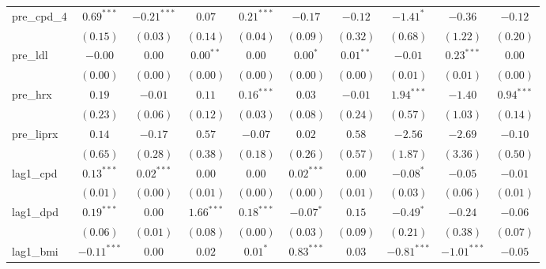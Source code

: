 \begin{tabular}{l c c c c c c c c c}
pre\_cpd\_4      & $0.69^{***}$  & $-0.21^{***}$ & $0.07$        & $0.21^{***}$  & $-0.17$       & $-0.12$        & $-1.41^{*}$   & $-0.36$       & $-0.12$        \\
                 & $(0.15)$      & $(0.03)$      & $(0.14)$      & $(0.04)$      & $(0.09)$      & $(0.32)$       & $(0.68)$      & $(1.22)$      & $(0.20)$       \\
pre\_ldl         & $-0.00$       & $0.00$        & $0.00^{**}$   & $0.00$        & $0.00^{*}$    & $0.01^{**}$    & $-0.01$       & $0.23^{***}$  & $0.00$         \\
                 & $(0.00)$      & $(0.00)$      & $(0.00)$      & $(0.00)$      & $(0.00)$      & $(0.00)$       & $(0.01)$      & $(0.01)$      & $(0.00)$       \\
pre\_hrx         & $0.19$        & $-0.01$       & $0.11$        & $0.16^{***}$  & $0.03$        & $-0.01$        & $1.94^{***}$  & $-1.40$       & $0.94^{***}$   \\
                 & $(0.23)$      & $(0.06)$      & $(0.12)$      & $(0.03)$      & $(0.08)$      & $(0.24)$       & $(0.57)$      & $(1.03)$      & $(0.14)$       \\
pre\_liprx       & $0.14$        & $-0.17$       & $0.57$        & $-0.07$       & $0.02$        & $0.58$         & $-2.56$       & $-2.69$       & $-0.10$        \\
                 & $(0.65)$      & $(0.28)$      & $(0.38)$      & $(0.18)$      & $(0.26)$      & $(0.57)$       & $(1.87)$      & $(3.36)$      & $(0.50)$       \\
lag1\_cpd        & $0.13^{***}$  & $0.02^{***}$  & $0.00$        & $0.00$        & $0.02^{***}$  & $0.00$         & $-0.08^{*}$   & $-0.05$       & $-0.01$        \\
                 & $(0.01)$      & $(0.00)$      & $(0.01)$      & $(0.00)$      & $(0.00)$      & $(0.01)$       & $(0.03)$      & $(0.06)$      & $(0.01)$       \\
lag1\_dpd        & $0.19^{***}$  & $0.00$        & $1.66^{***}$  & $0.18^{***}$  & $-0.07^{*}$   & $0.15$         & $-0.49^{*}$   & $-0.24$       & $-0.06$        \\
                 & $(0.06)$      & $(0.01)$      & $(0.08)$      & $(0.00)$      & $(0.03)$      & $(0.09)$       & $(0.21)$      & $(0.38)$      & $(0.07)$       \\
lag1\_bmi        & $-0.11^{***}$ & $0.00$        & $0.02$        & $0.01^{*}$    & $0.83^{***}$  & $0.03$         & $-0.81^{***}$ & $-1.01^{***}$ & $-0.05$        \\

\end{tabular}
